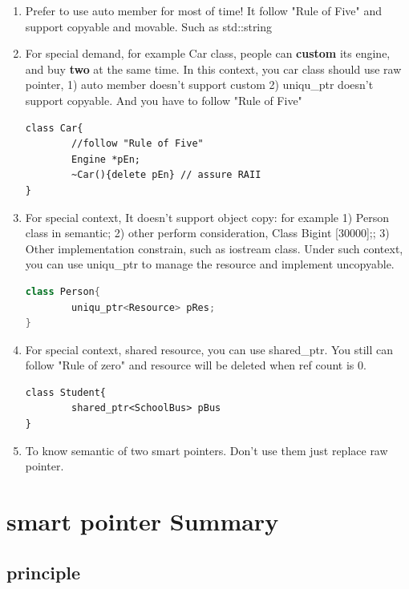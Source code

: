 \documentclass[a4paper,11pt,twoside]{book}
\begin{document}
\begin{itemize}
	\begin{enumerate}
		\item Prefer to use auto member for most of time! It follow "Rule of Five" and support copyable and movable. Such as std::string
		
		\item  For special demand, for example Car class,  people can \textbf{custom} its engine, and buy \textbf{two} at the same time. In this context, you car class should use raw pointer, 1) auto member doesn't support custom 2) uniqu\_ptr doesn't support copyable.  And you have to follow "Rule of Five"
\begin{lstlisting}[numbers=none]
class Car{
		//follow "Rule of Five"
		Engine *pEn;
		~Car(){delete pEn} // assure RAII
}
\end{lstlisting}
		
		\item For special context, It doesn't support object copy: for example 1) Person class in semantic;  2) other  perform consideration, Class Big{int [30000];};  3) Other implementation constrain, such as iostream class.   Under such context, you can use uniqu\_ptr to manage the resource and implement uncopyable.
\begin{lstlisting}[frame=single, language=c++]
class Person{
		uniqu_ptr<Resource> pRes;
}
		\end{lstlisting}
		
		\item For special context, shared resource, you can use shared\_ptr.  You still can follow "Rule of zero" and resource will be deleted when ref count is 0.
\begin{lstlisting}[numbers=none]
class Student{
		shared_ptr<SchoolBus> pBus
}
\end{lstlisting}
		
		\item To know semantic of two smart pointers. Don't use them just replace raw pointer.
	\end{enumerate}

\end{itemize}


\section{smart pointer Summary}

\subsection{principle}
\end{document}

